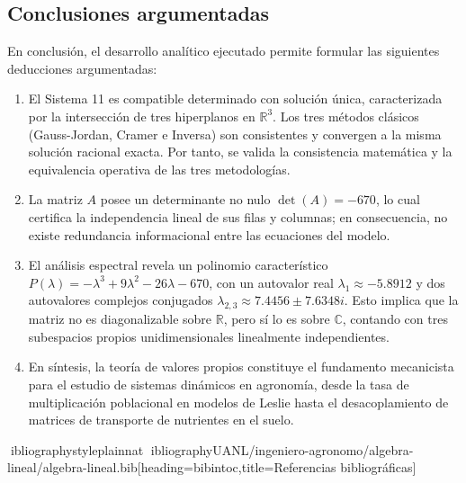 \documentclass[spanish,letterpaper,oneside]{article}
\begin{document}
\subsection{Conclusiones argumentadas}
En conclusión, el desarrollo analítico ejecutado permite formular las siguientes deducciones argumentadas:
\begin{enumerate}
\item El Sistema 11 es compatible determinado con solución única, caracterizada por la intersección de tres hiperplanos en $\mathbb{R}^3$. Los tres métodos clásicos (Gauss-Jordan, Cramer e Inversa) son consistentes y convergen a la misma solución racional exacta. Por tanto, se valida la consistencia matemática y la equivalencia operativa de las tres metodologías.
\item La matriz $A$ posee un determinante no nulo $\det(A) = -670$, lo cual certifica la independencia lineal de sus filas y columnas; en consecuencia, no existe redundancia informacional entre las ecuaciones del modelo.
\item El análisis espectral revela un polinomio característico $P(\lambda) = -\lambda^3 + 9\lambda^2 - 26\lambda - 670$, con un autovalor real $\lambda_1 \approx -5.8912$ y dos autovalores complejos conjugados $\lambda_{2,3} \approx 7.4456 \pm 7.6348i$. Esto implica que la matriz no es diagonalizable sobre $\mathbb{R}$, pero sí lo es sobre $\mathbb{C}$, contando con tres subespacios propios unidimensionales linealmente independientes.
\item En síntesis, la teoría de valores propios constituye el fundamento mecanicista para el estudio de sistemas dinámicos en agronomía, desde la tasa de multiplicación poblacional en modelos de Leslie hasta el desacoplamiento de matrices de transporte de nutrientes en el suelo.
\end{enumerate}

ibliographystyle{plainnat}
ibliography{UANL/ingeniero-agronomo/algebra-lineal/algebra-lineal.bib}[heading=bibintoc,title={Referencias bibliográficas}]
\end{document}
